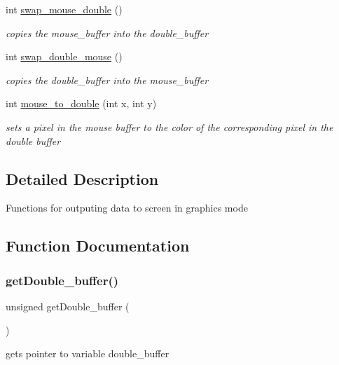 \begin{DoxyCompactItemize}
int \hyperlink{group__video__gr_ga56155e15f2cbeb0c0790c3b22db43a78}{swap\+\_\+mouse\+\_\+double} ()
\begin{DoxyCompactList}\small\item\em copies the mouse\+\_\+buffer into the double\+\_\+buffer \end{DoxyCompactList}\item 
int \hyperlink{group__video__gr_gacbc2b21e05ad693bb6ed614f87329f05}{swap\+\_\+double\+\_\+mouse} ()
\begin{DoxyCompactList}\small\item\em copies the double\+\_\+buffer into the mouse\+\_\+buffer \end{DoxyCompactList}\item 
int \hyperlink{group__video__gr_gaeae89e446fefdba5e72413ff38727f44}{mouse\+\_\+to\+\_\+double} (int x, int y)
\begin{DoxyCompactList}\small\item\em sets a pixel in the mouse buffer to the color of the corresponding pixel in the double buffer \end{DoxyCompactList}\end{DoxyCompactItemize}


\subsection{Detailed Description}
Functions for outputing data to screen in graphics mode 

\subsection{Function Documentation}
\hypertarget{group__video__gr_gafa0e51016d7aa337778300ba2ec70a74}{}\label{group__video__gr_gafa0e51016d7aa337778300ba2ec70a74} 
\subsubsection{\texorpdfstring{get\+Double\+\_\+buffer()}{getDouble\_buffer()}}
{\footnotesize\ttfamily unsigned get\+Double\+\_\+buffer (\begin{DoxyParamCaption}{ }\end{DoxyParamCaption})}



gets pointer to variable double\+\_\+buffer 

